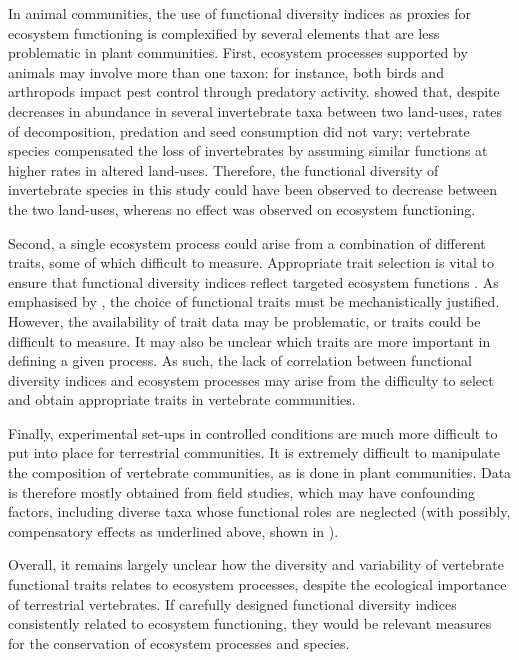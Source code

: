 In animal communities, the use of functional diversity indices as proxies for ecosystem functioning is complexified by several elements that are less problematic in plant communities. First, ecosystem processes supported by animals may involve more than one taxon: for instance, both birds and arthropods impact pest control through predatory activity. \citet{Ewers2015} showed that, despite decreases in abundance in several invertebrate taxa between two land-uses, rates of decomposition, predation and seed consumption did not vary; vertebrate species compensated the loss of invertebrates by assuming similar functions at higher rates in altered land-uses. Therefore, the functional diversity of invertebrate species in this study could have been observed to decrease between the two land-uses, whereas no effect was observed on ecosystem functioning. 

Second, a single ecosystem process could arise from a combination of different traits, some of which difficult to measure. Appropriate trait selection is vital to ensure that functional diversity indices reflect targeted ecosystem functions \citep{Luck2012}. As emphasised by \citet{Didham2016}, the choice of functional traits must be mechanistically justified. However, the availability of trait data may be problematic, or traits could be difficult to measure. It may also be unclear which traits are more important in defining a given process. As such, the lack of correlation between functional diversity indices and ecosystem processes may arise from the difficulty to select and obtain appropriate traits in vertebrate communities. 

Finally, experimental set-ups in controlled conditions are much more difficult to put into place for terrestrial communities. It is extremely difficult to manipulate the composition of vertebrate communities, as is done in plant communities. Data is therefore mostly obtained from field studies, which may have confounding factors, including diverse taxa whose functional roles are neglected (with possibly, compensatory effects as underlined above, shown in \citet{Ewers2015}).

Overall, it remains largely unclear how the diversity and variability of vertebrate functional traits relates to ecosystem processes, despite the ecological importance of terrestrial vertebrates. If carefully designed functional diversity indices consistently related to ecosystem functioning, they would be relevant measures for the conservation of ecosystem processes and species.  

